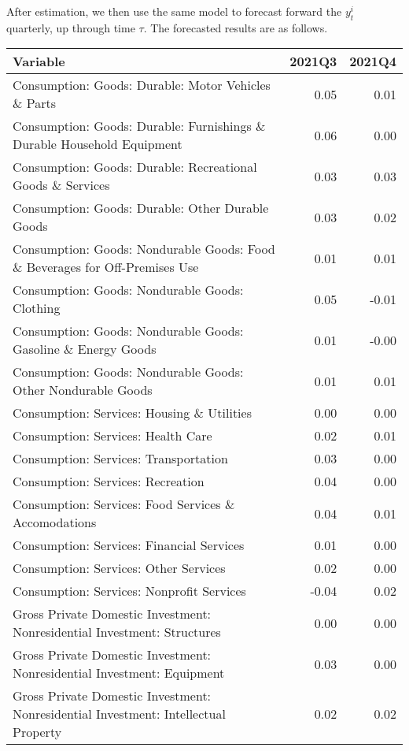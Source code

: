 \documentclass[11pt, letterpaper]{article}\usepackage[]{graphicx}\usepackage[]{color}
\begin{document}
After estimation, we then use the same model to forecast forward the $y^i_t$ quarterly, up through time $\tau$. 
The forecasted results are as follows.
\begin{table}[H]
\centering
\begingroup\scriptsize
\begin{tabular}{lrr}
  \hline
Variable & 2021Q3 & 2021Q4 \\ 
  \hline
Consumption: Goods: Durable: Motor Vehicles \& Parts & 0.05 & 0.01 \\ 
  Consumption: Goods: Durable: Furnishings \& Durable Household Equipment & 0.06 & 0.00 \\ 
  Consumption: Goods: Durable: Recreational Goods \& Services & 0.03 & 0.03 \\ 
  Consumption: Goods: Durable: Other Durable Goods & 0.03 & 0.02 \\ 
  Consumption: Goods: Nondurable Goods: Food \& Beverages for Off-Premises Use & 0.01 & 0.01 \\ 
  Consumption: Goods: Nondurable Goods: Clothing & 0.05 & -0.01 \\ 
  Consumption: Goods: Nondurable Goods: Gasoline \& Energy Goods & 0.01 & -0.00 \\ 
  Consumption: Goods: Nondurable Goods: Other Nondurable Goods & 0.01 & 0.01 \\ 
  Consumption: Services: Housing \& Utilities & 0.00 & 0.00 \\ 
  Consumption: Services: Health Care & 0.02 & 0.01 \\ 
  Consumption: Services: Transportation & 0.03 & 0.00 \\ 
  Consumption: Services: Recreation & 0.04 & 0.00 \\ 
  Consumption: Services: Food Services \& Accomodations & 0.04 & 0.01 \\ 
  Consumption: Services: Financial Services & 0.01 & 0.00 \\ 
  Consumption: Services: Other Services & 0.02 & 0.00 \\ 
  Consumption: Services: Nonprofit Services & -0.04 & 0.02 \\ 
  Gross Private Domestic Investment: Nonresidential Investment: Structures & 0.00 & 0.00 \\ 
  Gross Private Domestic Investment: Nonresidential Investment: Equipment & 0.03 & 0.00 \\ 
  Gross Private Domestic Investment: Nonresidential Investment: Intellectual Property & 0.02 & 0.02 \\ 

\end{tabular}
\end{table}
\end{document}
